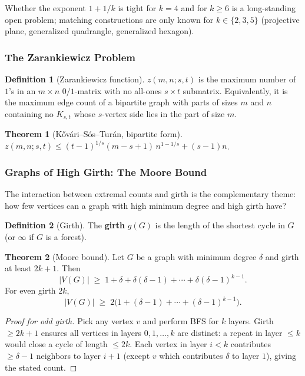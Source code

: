 \documentclass{article}
\theoremstyle{definition}
\newtheorem{theorem}{Theorem}
\newtheorem{definition}{Definition}
\begin{document}
Whether the exponent $1 + 1/k$ is tight for $k = 4$ and for $k \ge 6$
is a long-standing open problem; matching constructions are only known
for $k \in \{2, 3, 5\}$
(projective plane, generalized quadrangle, generalized hexagon).

\subsubsection{The Zarankiewicz Problem}

\begin{definition}[Zarankiewicz function]
$z(m, n; s, t)$ is the maximum number of $1$'s in an $m \times n$
$0/1$-matrix with no all-ones $s \times t$ submatrix. Equivalently,
it is the maximum edge count of a bipartite graph with parts of sizes
$m$ and $n$ containing no $K_{s, t}$ whose $s$-vertex side lies in the
part of size $m$.
\end{definition}

\begin{theorem}[K\H{o}v\'ari--S\'os--Tur\'an, bipartite form]
$z(m, n; s, t) \le (t - 1)^{1/s}(m - s + 1)\, n^{1 - 1/s} + (s - 1) n$.
\end{theorem}

\subsubsection{Graphs of High Girth: The Moore Bound}

The interaction between extremal counts and girth is the complementary
theme: how few vertices can a graph with high minimum degree and
high girth have?

\begin{definition}[Girth]
The \textbf{girth} $g(G)$ is the length of the shortest cycle in $G$
(or $\infty$ if $G$ is a forest).
\end{definition}

\begin{theorem}[Moore bound]\label{thm:moore}
Let $G$ be a graph with minimum degree $\delta$ and girth at least
$2k + 1$. Then
\[
  |V(G)| \;\ge\; 1 + \delta + \delta(\delta - 1) + \cdots + \delta(\delta - 1)^{k - 1}.
\]
For even girth $2k$,
\[
  |V(G)| \;\ge\; 2\big(1 + (\delta - 1) + \cdots + (\delta - 1)^{k - 1}\big).
\]
\end{theorem}

\begin{proof}[Proof for odd girth]
Pick any vertex $v$ and perform BFS for $k$ layers. Girth $\ge 2k + 1$
ensures all vertices in layers $0, 1, \dots, k$ are distinct: a
repeat in layer $\le k$ would close a cycle of length $\le 2k$.
Each vertex in layer $i < k$ contributes $\ge \delta - 1$ neighbors
to layer $i + 1$ (except $v$ which contributes $\delta$ to layer $1$),
giving the stated count.
\end{proof}
\end{document}
